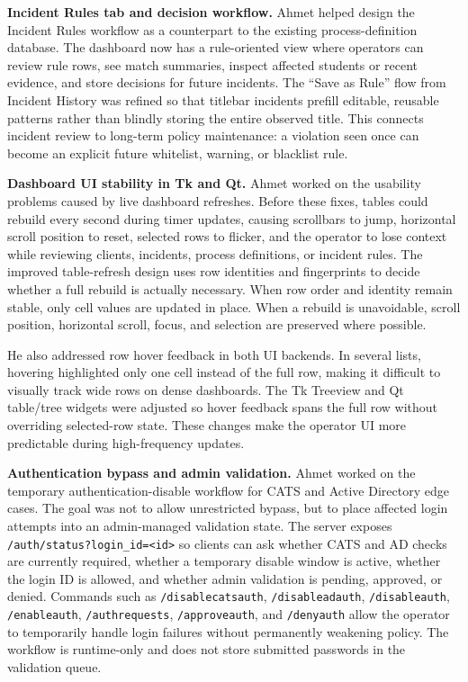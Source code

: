\textbf{Incident Rules tab and decision workflow.} Ahmet helped design the Incident Rules workflow as a counterpart to the existing process-definition database. The dashboard now has a rule-oriented view where operators can review rule rows, see match summaries, inspect affected students or recent evidence, and store decisions for future incidents. The ``Save as Rule'' flow from Incident History was refined so that titlebar incidents prefill editable, reusable patterns rather than blindly storing the entire observed title. This connects incident review to long-term policy maintenance: a violation seen once can become an explicit future whitelist, warning, or blacklist rule.

\textbf{Dashboard UI stability in Tk and Qt.} Ahmet worked on the usability problems caused by live dashboard refreshes. Before these fixes, tables could rebuild every second during timer updates, causing scrollbars to jump, horizontal scroll position to reset, selected rows to flicker, and the operator to lose context while reviewing clients, incidents, process definitions, or incident rules. The improved table-refresh design uses row identities and fingerprints to decide whether a full rebuild is actually necessary. When row order and identity remain stable, only cell values are updated in place. When a rebuild is unavoidable, scroll position, horizontal scroll, focus, and selection are preserved where possible.

He also addressed row hover feedback in both UI backends. In several lists, hovering highlighted only one cell instead of the full row, making it difficult to visually track wide rows on dense dashboards. The Tk Treeview and Qt table/tree widgets were adjusted so hover feedback spans the full row without overriding selected-row state. These changes make the operator UI more predictable during high-frequency updates.

\textbf{Authentication bypass and admin validation.} Ahmet worked on the temporary authentication-disable workflow for CATS and Active Directory edge cases. The goal was not to allow unrestricted bypass, but to place affected login attempts into an admin-managed validation state. The server exposes \texttt{/auth/status?login\_id=<id>} so clients can ask whether CATS and AD checks are currently required, whether a temporary disable window is active, whether the login ID is allowed, and whether admin validation is pending, approved, or denied. Commands such as \texttt{/disablecatsauth}, \texttt{/disableadauth}, \texttt{/disableauth}, \texttt{/enableauth}, \texttt{/authrequests}, \texttt{/approveauth}, and \texttt{/denyauth} allow the operator to temporarily handle login failures without permanently weakening policy. The workflow is runtime-only and does not store submitted passwords in the validation queue.


